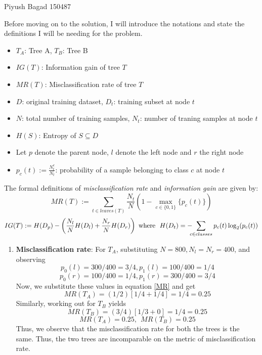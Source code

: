 \documentclass[a4paper,11pt]{article}
\begin{document}
{Piyush Bagad}   %
{150487}	%

\begin{mlsolution}
	
Before moving on to the solution, I will introduce the notations and state the definitions I will be needing for the problem.
\begin{itemize}
	\item $T_A$: Tree A, $T_B$: Tree B
	\vspace{-2.5mm}
	\item $IG(T)$: Information gain of tree $T$
	\vspace{-2.5mm}
	\item $MR(T)$: Misclassification rate of tree $T$
	\vspace{-2.5mm}
	\item $D$: original training dataset, $D_t$: training subset at node $t$
	\vspace{-2.5mm}
	\item $N$: total number of training samples, $N_t$: number of traning samples at node $t$
	\vspace{-2.5mm}
	\item $H(S)$: Entropy of $S \subseteq D$
	\vspace{-2.5mm}
	\item Let $p$ denote the parent node, $l$ denote the left node and $r$ the right node
	\vspace{-2.5mm}
	\item $p_c(t) := \frac{N^c_t}{N_t}$: probability of a sample belonging to class $c$ at node $t$
\end{itemize}
The formal definitions of \textit{misclassification rate} and \textit{information gain} are given by:
\begin{equation}
\label{MR}
MR(T):= \sum_{t \in leaves(T)}\frac{N_t}{N}\left(1 - \max_{c \in \{0,1\}}\{p_c(t)\}\right)
\end{equation}
\begin{equation}
\label{IG}
IG(T) := H(D_p) - \left(\frac{N_l}{N}H(D_l) + \frac{N_r}{N}H(D_r)\right) \ \text{where} \ \ H(D_t) = -\hspace{-2mm}\sum_{c \in classes}p_c(t)\log_{2}(p_c(t))
\end{equation}
\begin{enumerate}
	\item \textbf{Misclassification rate}: For $T_A$, substituting $N = 800, N_l = N_r = 400$, and observing
	\[
	p_0(l) = 300/400 = 3/4, p_1(l) = 100/400 = 1/4
	\]
	\[
	p_0(r) = 100/400 = 1/4, p_1(r) = 300/400 = 3/4
	\]
	Now, we substitute these values in equation \ref{MR} and get
	\[
	MR(T_A) = (1/2)[1/4 + 1/4] = 1/4 = 0.25
	\] 
	Similarly, working out for $T_B$ yields
	\[
	MR(T_B) = (3/4)[1/3 + 0] = 1/4 = 0.25
	\]
	\[
	\boxed{MR(T_A) = 0.25, \ \ MR(T_B) = 0.25}
	\]
	Thus, we observe that the misclassification rate for both the trees is the same. Thus, the two trees are incomparable on the metric of misclassification rate. 
	

\end{enumerate}
\end{mlsolution}
\end{document}
